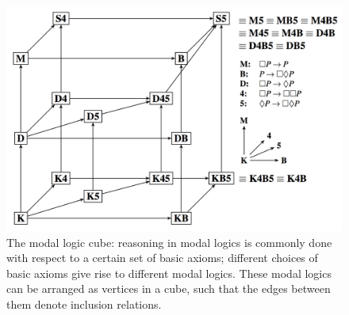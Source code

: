 \begin{isabellebody}
\begin{isamarkuptext}
\begin{figure}[tp]



    

\includegraphics[width=.8\textwidth]{cube.png}

\caption{The modal logic cube: 
reasoning in modal logics is commonly done with
respect to a certain set of basic axioms; different choices of basic
axioms give rise to different modal logics. These modal logics can be
arranged as vertices in a cube, such that the edges between them
denote inclusion relations.
}
\label{fig1}
\end{figure}




\end{isamarkuptext}
\end{isabellebody}
